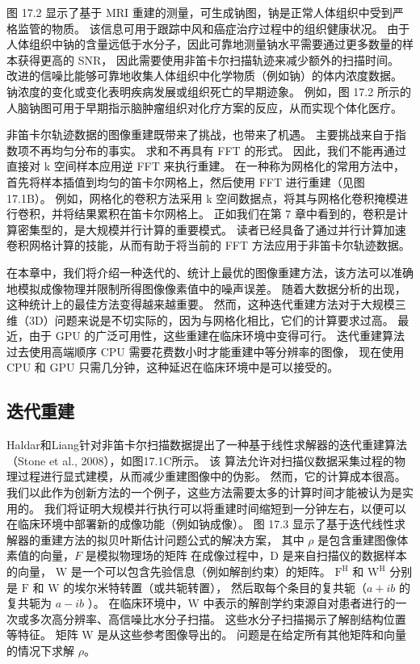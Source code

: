 图 17.2 显示了基于 MRI 重建的测量，可生成钠图，钠是正常人体组织中受到严格监管的物质。 
该信息可用于跟踪中风和癌症治疗过程中的组织健康状况。 
由于人体组织中钠的含量远低于水分子，因此可靠地测量钠水平需要通过更多数量的样本获得更高的 SNR，
因此需要使用非笛卡尔扫描轨迹来减少额外的扫描时间。 
改进的信噪比能够可靠地收集人体组织中化学物质（例如钠）的体内浓度数据。 
钠浓度的变化或变化表明疾病发展或组织死亡的早期迹象。 
例如，图 17.2 所示的人脑钠图可用于早期指示脑肿瘤组织对化疗方案的反应，从而实现个体化医疗。

非笛卡尔轨迹数据的图像重建既带来了挑战，也带来了机遇。 主要挑战来自于指数项不再均匀分布的事实。 
求和不再具有 FFT 的形式。 因此，我们不能再通过直接对 k 空间样本应用逆 FFT 来执行重建。 
在一种称为网格化的常用方法中，首先将样本插值到均匀的笛卡尔网格上，然后使用 FFT 进行重建（见图 17.1B）。 
例如，网格化的卷积方法采用 k 空间数据点，将其与网格化卷积掩模进行卷积，并将结果累积在笛卡尔网格上。 
正如我们在第 7 章中看到的，卷积是计算密集型的，是大规模并行计算的重要模式。 
读者已经具备了通过并行计算加速卷积网格计算的技能，从而有助于将当前的 FFT 方法应用于非笛卡尔轨迹数据。

在本章中，我们将介绍一种迭代的、统计上最优的图像重建方法，该方法可以准确地模拟成像物理并限制所得图像像素值中的噪声误差。 
随着大数据分析的出现，这种统计上的最佳方法变得越来越重要。 
然而，这种迭代重建方法对于大规模三维（3D）问题来说是不切实际的，因为与网格化相比，它们的计算要求过高。 
最近，由于 GPU 的广泛可用性，这些重建在临床环境中变得可行。 
迭代重建算法过去使用高端顺序 CPU 需要花费数小时才能重建中等分辨率的图像，
现在使用 CPU 和 GPU 只需几分钟，这种延迟在临床环境中是可以接受的。

\subsection{迭代重建}
Haldar和Liang针对非笛卡尔扫描数据提出了一种基于线性求解器的迭代重建算法（Stone et al., 2008），如图17.1C所示。 该
算法允许对扫描仪数据采集过程的物理过程进行显式建模，从而减少重建图像中的伪影。 然而，它的计算成本很高。 
我们以此作为创新方法的一个例子，这些方法需要太多的计算时间才能被认为是实用的。 
我们将证明大规模并行执行可以将重建时间缩短到一分钟左右，以便可以在临床环境中部署新的成像功能（例如钠成像）。 
图 17.3 显示了基于迭代线性求解器的重建方法的拟贝叶斯估计问题公式的解决方案，
其中 $\rho$ 是包含重建图像体素值的向量，$F$ 是模拟物理场的矩阵 在成像过程中，D 是来自扫描仪的数据样本的向量，
$\mathrm{W}$ 是一个可以包含先验信息（例如解剖约束）的矩阵。 
$\mathrm{F}^{\mathrm{H}}$ 和 $\mathrm{W}^{\mathrm{H}}$ 
分别是 $\mathrm{F}$ 和 $\mathrm{W}$ 的埃尔米特转置（或共轭转置），
然后取每个条目的复共轭（$a+i b$ 的复共轭为 $a-i b$ ）。 
在临床环境中，$\mathrm{W}$ 中表示的解剖学约束源自对患者进行的一次或多次高分辨率、高信噪比水分子扫描。 
这些水分子扫描揭示了解剖结构位置等特征。 矩阵 $\mathrm{W}$ 是从这些参考图像导出的。 
问题是在给定所有其他矩阵和向量的情况下求解 $\rho$。

